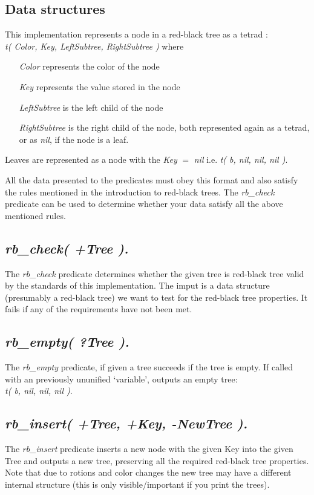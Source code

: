\documentclass{article}
\newcommand{\inlinecode}[1]{\textit{#1}}
\begin{document}
\subsection{Data structures}
This implementation represents a node in a red-black tree as a tetrad : 
\\\inlinecode{t( Color, Key, LeftSubtree, RightSubtree )} where
\begin{itemize}
  \item[\inlinecode{Color}] represents the color of the node
  \item[\inlinecode{Key}] represents the value stored in the node
  \item[\inlinecode{LeftSubtree}] is the left child of the node
  \item[\inlinecode{RightSubtree}] is the right child of the node, both represented again as a tetrad, or as \inlinecode{nil}, if the node is a leaf.
\end{itemize}
Leaves are represented as a node with the \inlinecode{Key} $=$ \inlinecode{nil} i.e. \inlinecode{t( b, nil, nil, nil )}.

All the data presented to the predicates must obey this format and also satisfy the rules mentioned in the introduction to red-black trees. The \inlinecode{rb\_check} predicate can be used to determine whether your data satisfy all the above mentioned rules.

\subsection{\inlinecode{rb\_check( +Tree ).}}
The \inlinecode{rb\_check} predicate determines whether the given tree is red-black tree valid by the standards of this implementation. The imput is a data structure (presumably a red-black tree) we want to test for the red-black tree properties. It fails if any of the requirements have not been met.

\subsection{\inlinecode{rb\_empty( ?Tree ).}}
The \inlinecode{rb\_empty} predicate, if given a tree succeeds if the tree is empty. If called with an previously ununified `variable', outputs an empty tree: \\\inlinecode{t( b, nil, nil, nil )}.

\subsection{\inlinecode{rb\_insert( +Tree, +Key, -NewTree ).}}
The \inlinecode{rb\_insert} predicate inserts a new node with the given Key into the given Tree and outputs a new tree, preserving all the required red-black tree properties. Note that due to rotions and color changes the new tree may have a different internal structure (this is only visible/important if you print the trees).
\end{document}
